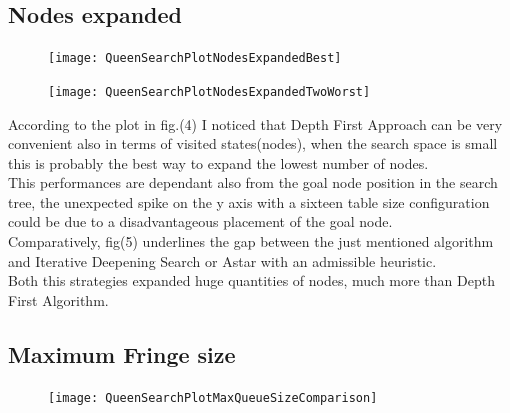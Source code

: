 \documentclass{article}
\begin{document}
					\subsection{Nodes expanded}
					
\begin{center}
\begin{figure}
\centering
\texttt{[image: QueenSearchPlotNodesExpandedBest]}
\caption{}
\label{fig:4}
\end{figure}
\end{center}
		
		
\begin{center}
\begin{figure}
\centering
\texttt{[image: QueenSearchPlotNodesExpandedTwoWorst]}
\caption{}
\label{fig:5}
\end{figure}
\end{center}

According to the plot in fig.(4) I noticed that Depth First Approach can be very convenient also in terms of visited states(nodes), when the search space is small this is probably the best way to expand the lowest number of nodes.\medskip\\
 This performances are dependant also from the goal node position in the search tree, the unexpected spike on the y axis with a sixteen table size configuration could be due to a disadvantageous placement of the goal node.\medskip\\
Comparatively, fig(5) underlines the gap between the just mentioned algorithm and Iterative Deepening Search or Astar with an admissible heuristic.\\
Both this strategies expanded huge quantities of nodes, much more than Depth First Algorithm.

					\subsection{Maximum Fringe size}
					
												
\begin{center}
\begin{figure}
\centering
\texttt{[image: QueenSearchPlotMaxQueueSizeComparison]}
\caption{}
\label{fig:6}
\end{figure}
\end{center}
\end{document}
